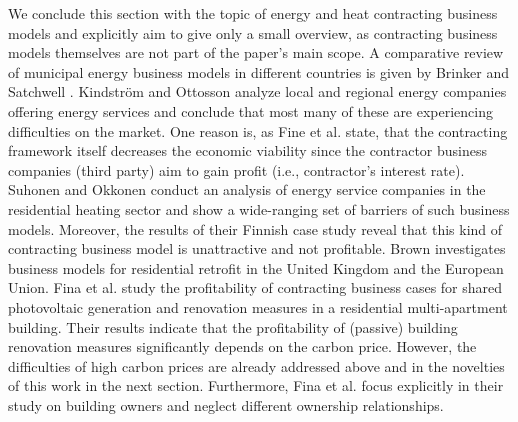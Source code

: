 We conclude this section with the topic of energy and heat contracting business models and explicitly aim to give only a small overview, as contracting business models themselves are not part of the paper's main scope. A comparative review of municipal energy business models in different countries is given by Brinker and Satchwell \cite{brinker2020comparative}. Kindström and Ottosson \cite{kindstrom2016local} analyze local and regional energy companies offering energy services and conclude that most many of these are experiencing difficulties on the market. One reason is, as Fine et al. state, that the contracting framework itself decreases the economic viability since the contractor business companies (third party) aim to gain profit (i.e., contractor's interest rate). Suhonen and Okkonen \cite{suhonen2013energy} conduct an analysis of energy service companies in the residential heating sector and show a wide-ranging set of barriers of such business models. Moreover, the results of their Finnish case study reveal that this kind of contracting business model is unattractive and not profitable. Brown \cite{brown2018business} investigates business models for residential retrofit in the United Kingdom and the European Union. Fina et al. \cite{fina2020profitability} study the profitability of contracting business cases for shared photovoltaic generation and renovation measures in a residential multi-apartment building. Their results indicate that the profitability of (passive) building renovation measures significantly depends on the carbon price. However, the difficulties of high carbon prices are already addressed above and in the novelties of this work in the next section. Furthermore, Fina et al. focus explicitly in their study on building owners and neglect different ownership relationships.  

